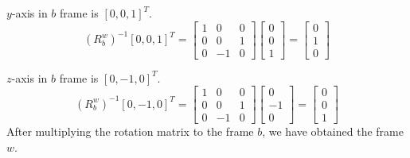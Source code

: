 \documentclass[answers]{exam}
\begin{document}
\begin{questions}
\begin{parts}
\begin{solution}
            $y$-axis in $b$ frame is $[0, 0, 1]^T$.
            \begin{equation*}
                (R^w_b)^{-1} [0, 0, 1]^T = \begin{bmatrix}
                    1 & 0  & 0 \\
                    0 & 0  & 1 \\
                    0 & -1 & 0
                \end{bmatrix}
                \begin{bmatrix}
                    0 \\
                    0 \\
                    1
                \end{bmatrix}
                = \begin{bmatrix}
                    0 \\
                    1 \\
                    0
                \end{bmatrix}
            \end{equation*}

            $z$-axis in $b$ frame is $[0, -1, 0]^T$.
            \begin{equation*}
                (R^w_b)^{-1} [0, -1, 0]^T = \begin{bmatrix}
                    1 & 0  & 0 \\
                    0 & 0  & 1 \\
                    0 & -1 & 0
                \end{bmatrix}
                \begin{bmatrix}
                    0  \\
                    -1 \\
                    0
                \end{bmatrix}
                = \begin{bmatrix}
                    0 \\
                    0 \\
                    1
                \end{bmatrix}
            \end{equation*}
            After multiplying the rotation matrix to the frame $b$, we have obtained the
            frame $w$.

        \end{solution}


\end{parts}
\end{questions}
\end{document}
